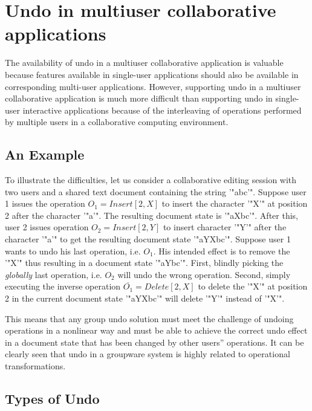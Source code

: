 \appendix

\section{Undo in multiuser collaborative applications}
\label{sect:undo}

The availability of undo in a multiuser collaborative application is valuable because features available in single-user applications should also be available in corresponding multi-user applications. However, supporting undo in a multiuser collaborative application is much more difficult than supporting undo in single-user interactive applications because of the interleaving of operations performed by multiple users in a collaborative computing environment.


\subsection{An Example}

To illustrate the difficulties, let us consider a collaborative editing session with two users and a shared text document containing the string '"abc'". Suppose user 1 issues the operation $O_{1} = Insert[2,X]$ to insert the character '"X'" at position 2 after the character '"a'". The resulting document state is '"aXbc'". After this, user 2 issues operation $O_{2} = Insert[2,Y]$ to insert character '"Y'" after the character '"a'" to get the resulting document state '"aYXbc'". Suppose user 1 wants to undo his last operation, i.e. $O_{1}$. His intended effect is to remove the '"X'" thus resulting in a document state '"aYbc'". First, blindly picking the \emph{globally} last operation, i.e. $O_{2}$ will undo the wrong operation. Second, simply executing the inverse operation $\overline{O_{1}} = Delete[2,X]$ to delete the '"X'" at position 2 in the current document state '"aYXbc'" will delete '"Y'" instead of '"X'".

This means that any group undo solution must meet the challenge of undoing operations in a nonlinear way and must be able to achieve the correct undo effect in a document state that has been changed by other users'' operations. It can be clearly seen that undo in a groupware system is highly related to operational transformations.


\subsection{Types of Undo}

